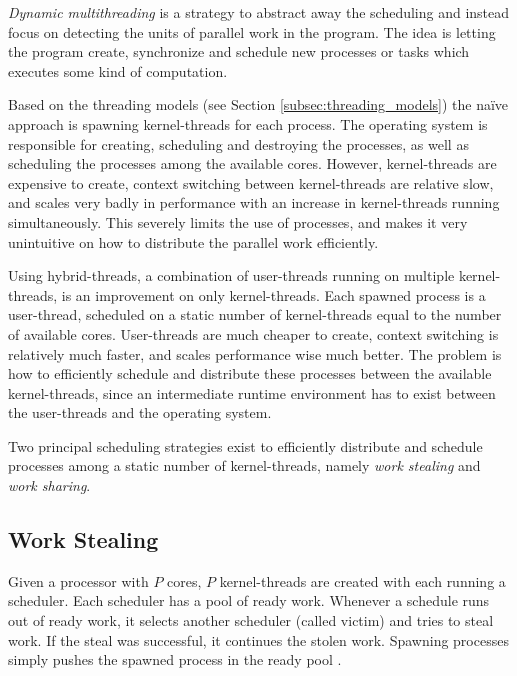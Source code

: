 \textit{Dynamic multithreading} is a strategy to abstract away the scheduling and instead focus on detecting the units of parallel work in the program. The idea is letting the program create, synchronize and schedule new processes or tasks which executes some kind of computation. 

Based on the threading models (see Section \ref{subsec:threading_models}) the naïve approach is spawning kernel\hyp{}threads for each process. The operating system is responsible for creating, scheduling and destroying the processes, as well as scheduling the processes among the available cores. However, kernel\hyp{}threads are expensive to create, context switching between kernel\hyp{}threads are relative slow, and scales very badly in performance with an increase in kernel\hyp{}threads running simultaneously. This severely limits the use of processes, and makes it very unintuitive on how to distribute the parallel work efficiently.

Using hybrid\hyp{}threads, a combination of user\hyp{}threads running on multiple kernel\hyp{}threads, is an improvement on only kernel\hyp{}threads. Each spawned process is a user\hyp{}thread, scheduled on a static number of kernel\hyp{}threads equal to the number of available cores. User\hyp{}threads are much cheaper to create, context switching is relatively much faster, and scales performance wise much better. The problem is how to efficiently schedule and distribute these processes between the available kernel\hyp{}threads, since an intermediate runtime environment has to exist between the user\hyp{}threads and the operating system.

Two principal scheduling strategies exist to efficiently distribute and schedule processes among a static number of kernel\hyp{}threads, namely \textit{work stealing} and \textit{work sharing}.


\subsection{Work Stealing}
\label{subsec:work_stealing}

Given a processor with $P$ cores, $P$ kernel\hyp{}threads are created with each running a scheduler. Each scheduler has a pool of ready work. Whenever a schedule runs out of ready work, it selects another scheduler (called victim) and tries to steal work. If the steal was successful, it continues the stolen work. Spawning processes simply pushes the spawned process in the ready pool \citep{blumofe1999scheduling}.

